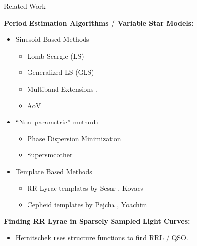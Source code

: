 \documentclass[12pt]{beamer}
\begin{document}
\begin{frame}{Related Work}

\textbf{Period Estimation Algorithms / Variable Star Models:}
\begin{itemize}
\item Sinusoid Based Methods
\begin{itemize}
\item Lomb Scargle (LS) \cite{lomb1976least,scargle1982studies}
\item Generalized LS (GLS) \cite{zechmeister2009generalised}
\item Multiband Extensions \cite{vanderplas2015periodograms,long2014estimating}.
\item AoV \cite{schwarzenberg1996fast}
\end{itemize}
\item ``Non--parametric'' methods
\begin{itemize}
\item Phase Dispersion Minimization \cite{stellingwerf1978period}
\item Supersmoother \cite{sesar2010light}
\end{itemize}
\item Template Based Methods
\begin{itemize}
\item RR Lyrae templates by Sesar \cite{sesar2010light}, Kovacs \cite{kovacs2007computation}
\item Cepheid templates by Pejcha \cite{pejcha2012global}, Yoachim \cite{yoachim2009panoply}
\end{itemize}
\end{itemize}

\vspace{.1in}

\textbf{Finding RR Lyrae in Sparsely Sampled Light Curves:}
\begin{itemize}
\item Hernitschek \cite{hernitschek2016finding} uses structure functions to find RRL / QSO.
\end{itemize}


\end{frame}
\end{document}
